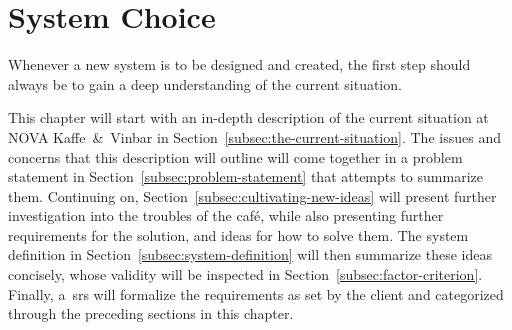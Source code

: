 \section{System Choice}\label{sec:system-choice}

Whenever a new system is to be designed and created, the first step should always be to gain a deep understanding of the
current situation.

This chapter will start with an in-depth description of the current situation at NOVA Kaffe~\&~Vinbar in
Section~\ref{subsec:the-current-situation}.
The issues and concerns that this description will outline will come together in a problem statement in
Section~\ref{subsec:problem-statement} that attempts to summarize them.
Continuing on, Section~\ref{subsec:cultivating-new-ideas} will present further investigation into the troubles of the café,
while also presenting further requirements for the solution, and ideas for how to solve them.
The system definition in Section~\ref{subsec:system-definition} will then summarize these ideas concisely, whose validity
will be inspected in Section~\ref{subsec:factor-criterion}.
Finally, a~\acrfull{srs} will formalize the requirements as set by the client and categorized through the preceding
sections in this chapter.







